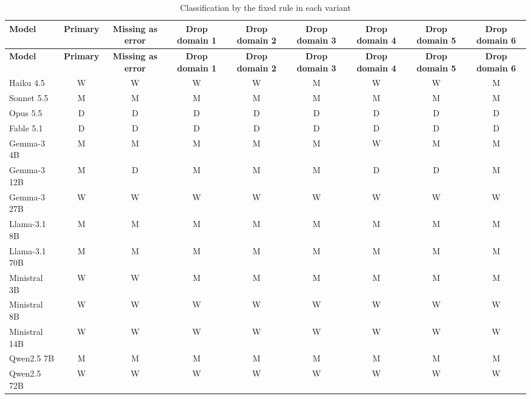 \documentclass[10pt,a4paper]{article}
\begin{document}
\begin{tiny}
\setlength{\tabcolsep}{2pt}
\begin{longtable}{lcccccccc}
\caption{Classification by the fixed rule in each variant}\\
\toprule
\textbf{Model} & \textbf{Primary} & \textbf{Missing as error} & \textbf{Drop domain 1} & \textbf{Drop domain 2} & \textbf{Drop domain 3} & \textbf{Drop domain 4} & \textbf{Drop domain 5} & \textbf{Drop domain 6} \\
\midrule
\endfirsthead
\toprule
\textbf{Model} & \textbf{Primary} & \textbf{Missing as error} & \textbf{Drop domain 1} & \textbf{Drop domain 2} & \textbf{Drop domain 3} & \textbf{Drop domain 4} & \textbf{Drop domain 5} & \textbf{Drop domain 6} \\
\midrule
\endhead
\bottomrule
\endfoot
Haiku 4.5 & W & W & W & W & M & W & W & M \\
Sonnet 5.5 & M & M & M & M & M & M & M & M \\
Opus 5.5 & D & D & D & D & D & D & D & D \\
Fable 5.1 & D & D & D & D & D & D & D & D \\
Gemma-3 4B & M & M & M & M & M & W & M & M \\
Gemma-3 12B & M & D & M & M & M & D & D & M \\
Gemma-3 27B & W & W & W & W & W & W & W & W \\
Llama-3.1 8B & M & M & M & M & M & M & M & M \\
Llama-3.1 70B & M & M & M & M & M & M & M & M \\
Ministral 3B & W & W & M & M & M & M & M & M \\
Ministral 8B & W & W & W & W & W & W & W & W \\
Ministral 14B & W & W & W & W & W & W & W & W \\
Qwen2.5 7B & M & M & M & M & M & M & M & M \\
Qwen2.5 72B & W & W & W & W & W & W & W & W \\
\end{longtable}
\end{tiny}
\end{document}

